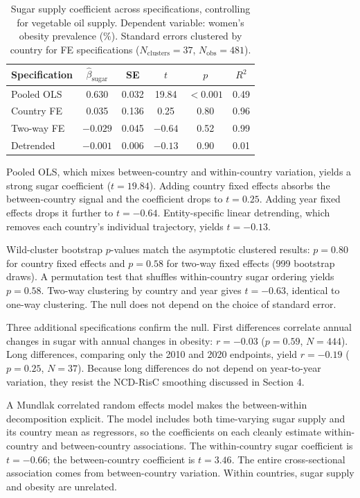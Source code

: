 \documentclass[letterpaper,11pt,leqno]{article}
\begin{document}
\begin{table}[htbp]
\caption{Sugar supply coefficient across specifications, controlling for vegetable oil supply. Dependent variable: women's obesity prevalence (\%). Standard errors clustered by country for FE specifications ($N_{\text{clusters}} = 37$, $N_{\text{obs}} = 481$).}
\label{tab:fe_cascade}
\begin{tabular*}{\textwidth}{@{\extracolsep\fill}lccccc}
\toprule
Specification & $\hat{\beta}_{\text{sugar}}$ & SE & $t$ & $p$ & $R^2$ \\
\midrule
Pooled OLS & 0.630 & 0.032 & 19.84 & $< 0.001$ & 0.49 \\
Country FE & 0.035 & 0.136 & 0.25 & 0.80 & 0.96 \\
Two-way FE & $-0.029$ & 0.045 & $-0.64$ & 0.52 & 0.99 \\
Detrended & $-0.001$ & 0.006 & $-0.13$ & 0.90 & 0.01 \\
\bottomrule
\end{tabular*}
\end{table}

Pooled OLS, which mixes between-country and within-country variation, yields a strong sugar coefficient ($t = 19.84$). Adding country fixed effects absorbs the between-country signal and the coefficient drops to $t = 0.25$. Adding year fixed effects drops it further to $t = -0.64$. Entity-specific linear detrending, which removes each country's individual trajectory, yields $t = -0.13$.

Wild-cluster bootstrap $p$-values match the asymptotic clustered results: $p = 0.80$ for country fixed effects and $p = 0.58$ for two-way fixed effects (999 bootstrap draws). A permutation test that shuffles within-country sugar ordering yields $p = 0.58$. Two-way clustering by country and year gives $t = -0.63$, identical to one-way clustering. The null does not depend on the choice of standard error.

Three additional specifications confirm the null. First differences correlate annual changes in sugar with annual changes in obesity: $r = -0.03$ ($p = 0.59$, $N = 444$). Long differences, comparing only the 2010 and 2020 endpoints, yield $r = -0.19$ ($p = 0.25$, $N = 37$). Because long differences do not depend on year-to-year variation, they resist the NCD-RisC smoothing discussed in Section 4.

A Mundlak correlated random effects model \citep{mundlak1978} makes the between-within decomposition explicit. The model includes both time-varying sugar supply and its country mean as regressors, so the coefficients on each cleanly estimate within-country and between-country associations. The within-country sugar coefficient is $t = -0.66$; the between-country coefficient is $t = 3.46$. The entire cross-sectional association comes from between-country variation. Within countries, sugar supply and obesity are unrelated.
\end{document}
